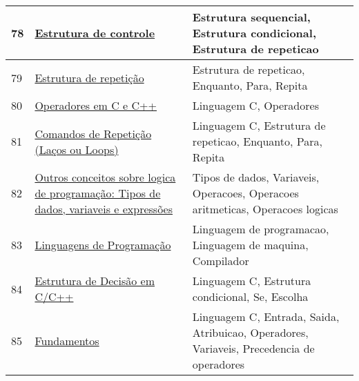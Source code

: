 \begin{longtable}{| p{} | p{} | p{} |}
78  & \href{https://pt.wikipedia.org/wiki/Estrutura\_de\_controle}{Estrutura de controle                                                               } & Estrutura sequencial, Estrutura condicional, Estrutura de repeticao                                                                               \\ \hline
79  & \href{https://pt.wikipedia.org/wiki/Estrutura\_de\_repeti\%C3\%A7\%C3\%A3o}{Estrutura de repetição                                                              } & Estrutura de repeticao, Enquanto, Para, Repita                                                                                                    \\ \hline
80  & \href{https://pt.wikipedia.org/wiki/Operadores\_em\_C\_e\_C\%2B\%2B}{Operadores em C e C++                                                               } & Linguagem C, Operadores                                                                                                                           \\ \hline
81  & \href{https://sites.google.com/site/itabits/treinamento/introducao-a-programacao-em-c/comandos-de-repeticao}{Comandos de Repetição (Laços ou Loops)                                              } & Linguagem C, Estrutura de repeticao, Enquanto, Para, Repita                                                                                       \\ \hline
82  & \href{https://www.dca.ufrn.br/~ivan/DCA0800/tiposDados.pdf}{Outros conceitos sobre logica de programação: Tipos de dados, variaveis e expressões} & Tipos de dados, Variaveis, Operacoes, Operacoes aritmeticas, Operacoes logicas                                                                    \\ \hline
83  & \href{https://www.dcc.fc.up.pt/~nam/aulas/9900/ic/slides/sliic9918/}{Linguagens de Programação                                                           } & Linguagem de programacao, Linguagem de maquina, Compilador                                                                                        \\ \hline
84  & \href{https://www.devmedia.com.br/estrutura-de-decisao-em-c-c/24031}{Estrutura de Decisão em C/C++                                                       } & Linguagem C, Estrutura condicional, Se, Escolha                                                                                                   \\ \hline
85  & \href{https://www.ime.usp.br/~hitoshi/introducao/03-Fundamentos.pdf}{Fundamentos                                                                         } & Linguagem C, Entrada, Saida, Atribuicao, Operadores, Variaveis, Precedencia de operadores                                                         \\ \hline

\end{longtable}
